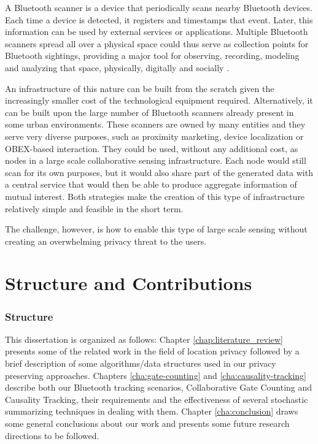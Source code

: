 A Bluetooth scanner is a device that periodically scans nearby
Bluetooth devices. Each time a device is detected, it registers and
timestamps that event. Later, this information can be used by external
services or applications. Multiple Bluetooth scanners spread all over
a physical space could thus serve as collection points for Bluetooth
sightings, providing a major tool for observing, recording, modeling
and analyzing that space, physically, digitally and socially
\cite{Oneill:2006vq}.

An infrastructure of this nature can be built from the scratch given
the increasingly smaller cost of the technological equipment required.
Alternatively, it can be built upon the large number of Bluetooth
scanners already present in some urban environments. These scanners
are owned by many entities and they serve very diverse purposes, such
as proximity marketing, device localization or OBEX-based interaction.
They could be used, without any additional cost, as nodes in a large
scale collaborative sensing infrastructure. Each node would still scan
for its own purposes, but it would also share part of the generated
data with a central service that would then be able to produce
aggregate information of mutual interest. Both strategies make the
creation of this type of infrastructure relatively simple and feasible
in the short term.

The challenge, however, is how to enable this type of large scale
sensing without creating an overwhelming privacy threat to the users.


\section{Structure and Contributions}
\label{sec:structure}

\subsubsection{Structure}
\label{sec:structure} This dissertation is organized as follows:
Chapter \ref{chap:literature_review} presents some of the related work
in the field of location privacy followed by a brief description of
some algorithms/data structures used in our privacy preserving
approaches. Chapters \ref{cha:gate-counting} and
\ref{cha:causality-tracking} describe both our Bluetooth tracking
scenarios, Collaborative Gate Counting and Causality Tracking, their
requirements and the effectiveness of several stochastic summarizing
techniques in dealing with them. Chapter \ref{cha:conclusion} draws
some general conclusions about our work and presents some future
research directions to be followed.

